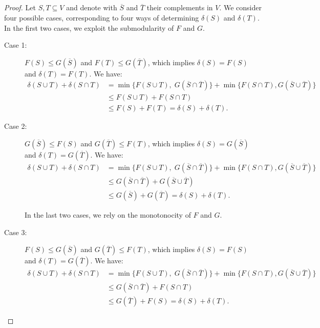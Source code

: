 \documentclass[letterpaper]{article}
\begin{document}
\subsection{}
\label{sec.appendix.omitted.polymatroidal}
\submodularsymmetrization*
\begin{proof}
Let $S,T \subseteq V$ and denote with $\overline{S}$ and $\overline{T}$ their complements in $V$. We consider four possible cases, corresponding to four ways of determining $\delta(S)$ and $\delta(T)$. In the first two cases, we exploit the submodularity of $F$ and $G$.
\begin{description}
\item[Case 1:] $F(S) \leq G(\overline{S})$ and $F(T) \leq G(\overline{T})$, which implies $\delta(S) = F(S)$ and $\delta(T) = F(T).$ We have:
\begin{align*}
    \delta(S \cup T) + \delta(S \cap T) &= \min\{F(S \cup T), \; G(\overline{S} \cap \overline{T})\} + \min\{F(S \cap T), G(\overline{S} \cup \overline{T})\}\\
    &\leq F(S\cup T) + F(S\cap T)\\
    &\leq F(S) + F(T) = \delta(S) + \delta(T).
\end{align*}
\item[Case 2:]
$G(\overline{S}) \leq F(S)$ and $G(\overline{T}) \leq F(T)$, which implies $\delta(S) = G(\overline{S})$ and $\delta(T) = G(\overline{T}).$ We have:
\begin{align*}
    \delta(S \cup T) + \delta(S \cap T) &= \min\{F(S \cup T), \; G(\overline{S} \cap \overline{T})\} + \min\{F(S \cap T), G(\overline{S} \cup \overline{T})\}\\
    &\leq G(\overline{S} \cap \overline{T}) + G(\overline{S} \cup \overline{T})\\
    &\leq G(\overline{S}) + G(\overline{T}) = \delta(S) + \delta(T).
\end{align*}

In the last two cases, we rely on the monotonocity of $F$ and $G$.
\item[Case 3:] $F(S) \leq G(\overline{S})$ and $G(\overline{T}) \leq F(T)$, which implies $\delta(S) = F(S)$ and $\delta(T) = G(\overline{T})$. We have:
\begin{align*}
    \delta(S \cup T) + \delta(S \cap T) &= \min\{F(S \cup T), \; G(\overline{S} \cap \overline{T})\} + \min\{F(S \cap T) , G(\overline{S} \cup \overline{T})\}\\
    &\leq G(\overline{S}\cap \overline{T}) + F(S \cap T) \\
    &\leq G(\overline{T}) + F(S)   = \delta(S) + \delta(T).
\end{align*}


\end{description}
\end{proof}
\end{document}
